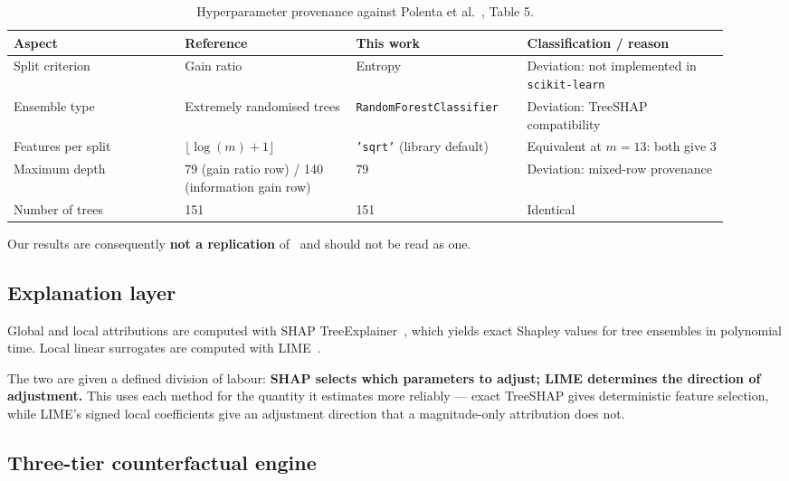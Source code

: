 \documentclass[11pt,a4paper]{article}
\begin{document}
\begin{table}[htbp]
\centering
\caption{Hyperparameter provenance against Polenta et al.~\cite{polenta2022}, Table 5.}
\label{tab:hyper}
\small
\begin{tabular}{@{}p{0.22\linewidth}p{0.22\linewidth}p{0.22\linewidth}p{0.26\linewidth}@{}}
\toprule
\textbf{Aspect} & \textbf{Reference} & \textbf{This work} & \textbf{Classification / reason} \\
\midrule
Split criterion & Gain ratio & Entropy & Deviation: not implemented in \texttt{scikit-learn} \\
Ensemble type & Extremely randomised trees & \texttt{RandomForestClassifier} & Deviation: TreeSHAP compatibility \\
Features per split & $\lfloor \log(m) + 1 \rfloor$ & \texttt{'sqrt'} (library default) & Equivalent at $m = 13$: both give 3 \\
Maximum depth & 79 (gain ratio row) / 140 (information gain row) & 79 & Deviation: mixed-row provenance \\
Number of trees & 151 & 151 & Identical \\
\bottomrule
\end{tabular}
\end{table}

Our results are consequently \textbf{not a replication} of~\cite{polenta2022} and should not be read as one.

\subsection{Explanation layer}

Global and local attributions are computed with SHAP TreeExplainer~\cite{lundberg2017}, which yields exact Shapley values for tree ensembles in polynomial time. Local linear surrogates are computed with LIME~\cite{ribeiro2016}.

The two are given a defined division of labour: \textbf{SHAP selects which parameters to adjust; LIME determines the direction of adjustment.} This uses each method for the quantity it estimates more reliably --- exact TreeSHAP gives deterministic feature selection, while LIME's signed local coefficients give an adjustment direction that a magnitude-only attribution does not.

\subsection{Three-tier counterfactual engine}
\end{document}
